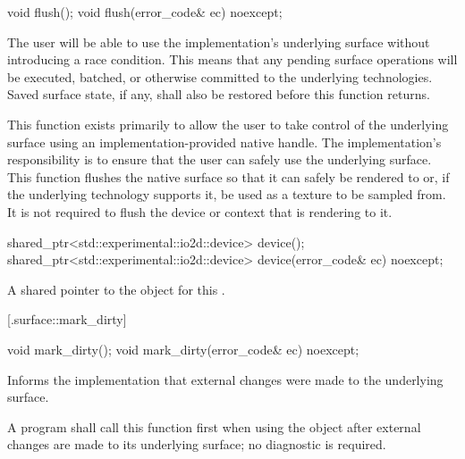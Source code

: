 \begin{itemdecl}
void flush();
void flush(error_code& ec) noexcept;
\end{itemdecl}
\begin{itemdescr}
	\pnum
	\effects
	The user will be able to use the implementation's underlying surface without introducing a race condition. This means that any pending surface operations will be executed, batched, or otherwise committed to the underlying technologies. Saved surface state, if any, shall also be restored before this function returns.
	
	\pnum
	\remarks
	This function exists primarily to allow the user to take control of the 
	underlying surface using an implementation-provided native handle. The implementation's responsibility is to ensure that the user can safely use the underlying surface.
	\enternote
	This function flushes the native surface so that it can safely be rendered to or, if the underlying technology supports it, be used as a texture to be sampled from. It is not required to flush the device or context that is rendering to it.
	\exitnote
\end{itemdescr}

%
\begin{itemdecl}
shared_ptr<std::experimental::io2d::device> device();
shared_ptr<std::experimental::io2d::device> device(error_code& ec) noexcept;
\end{itemdecl}
\begin{itemdescr}
	\pnum
	\returns
	A shared pointer to the  object for this .	
\end{itemdescr}

 [\iotwod.surface::mark_dirty] {}

\begin{itemdecl}
void mark_dirty();
void mark_dirty(error_code& ec) noexcept;
\end{itemdecl}
\begin{itemdescr}
	\pnum
	\effects
	Informs the implementation that external changes were made to the underlying surface.
	
	\pnum
	\remarks
	A program shall call this function first when using the  object after external changes are made to its underlying surface; no diagnostic is required.
\end{itemdescr}


